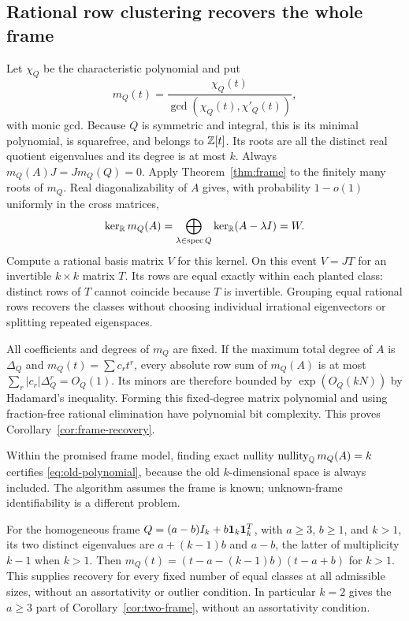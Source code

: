 \subsection{Rational row clustering recovers the whole frame}
Let $\chi_Q$ be the characteristic polynomial and put
\begin{equation}\label{eq:mQ}
 m_Q(t)=\frac{\chi_Q(t)}{\gcd(\chi_Q(t),\chi'_Q(t))},
\end{equation}
with monic gcd. Because $Q$ is symmetric and integral, this is its
minimal polynomial, is squarefree, and belongs to $\mathbb Z[t]$.
Its roots are all the distinct real quotient eigenvalues and its
degree is at most $k$.
Always $m_Q(A)J=Jm_Q(Q)=0$. Apply Theorem~\ref{thm:frame} to the
finitely many roots of $m_Q$. Real diagonalizability of $A$ gives,
with probability $1-o(1)$ uniformly in the cross matrices,
\begin{equation}\label{eq:old-polynomial}
 \ker_\mathbb R m_Q(A)
 =\bigoplus_{\lambda\in\operatorname{spec} Q}\ker_\mathbb R(A-\lambda I)=W.
\end{equation}
Compute a rational basis matrix $V$ for this kernel. On this event
$V=JT$ for an invertible $k\times k$ matrix $T$.
Its rows are equal exactly within each planted class: distinct rows
of $T$ cannot coincide because $T$ is invertible. Grouping equal
rational rows recovers the classes without choosing individual
irrational eigenvectors or splitting repeated eigenspaces.

All coefficients and degrees of $m_Q$ are fixed. If the maximum
total degree of $A$ is $\Delta_Q$ and $m_Q(t)=\sum c_rt^r$, every
absolute row sum of $m_Q(A)$ is at most
$\sum_r|c_r|\Delta_Q^r=O_Q(1)$. Its minors are therefore bounded by
$\exp(O_Q(kN))$ by Hadamard's inequality. Forming this fixed-degree
matrix polynomial and using fraction-free rational elimination have
polynomial bit complexity. This proves
Corollary~\ref{cor:frame-recovery}.

Within the promised frame model, finding exact nullity
$\operatorname{nullity}_\mathbb Q m_Q(A)=k$ certifies \eqref{eq:old-polynomial}, because
the old $k$-dimensional space is always included. The algorithm assumes
the frame is known; unknown-frame identifiability is a different problem.

For the homogeneous frame $Q=(a-b)I_k+b\mathbf 1_k\mathbf 1_k^T$, with
$a\ge3$, $b\ge1$, and $k>1$, its two distinct eigenvalues are
$a+(k-1)b$ and $a-b$, the latter of multiplicity $k-1$ when $k>1$.
Then $m_Q(t)=(t-a-(k-1)b)(t-a+b)$ for $k>1$. This supplies recovery
for every fixed number of equal classes at all admissible sizes, without an assortativity
or outlier condition. In particular $k=2$ gives the $a\ge3$ part
of Corollary~\ref{cor:two-frame}, without an assortativity condition.
